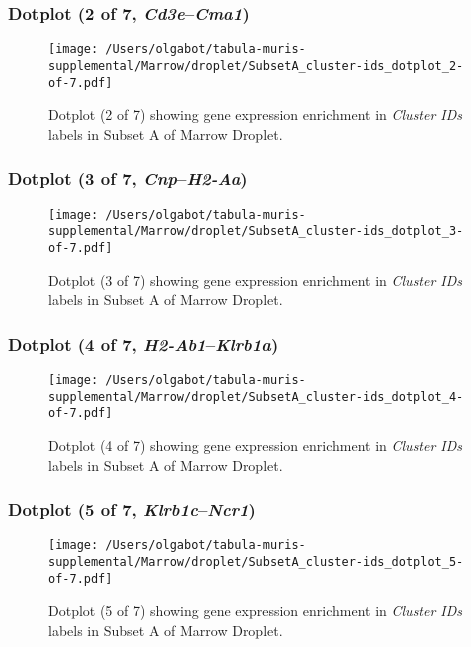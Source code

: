 \clearpage

\subsubsection{Dotplot (2 of 7, \emph{Cd3e}--\emph{Cma1})}
\begin{figure}[h]
\centering
\texttt{[image: /Users/olgabot/tabula-muris-supplemental/Marrow/droplet/SubsetA\_cluster-ids\_dotplot\_2-of-7.pdf]}

\caption{ Dotplot (2 of 7)  showing gene expression enrichment in \emph{Cluster IDs} labels in Subset A of Marrow Droplet. }
\end{figure}


\clearpage

\subsubsection{Dotplot (3 of 7, \emph{Cnp}--\emph{H2-Aa})}
\begin{figure}[h]
\centering
\texttt{[image: /Users/olgabot/tabula-muris-supplemental/Marrow/droplet/SubsetA\_cluster-ids\_dotplot\_3-of-7.pdf]}

\caption{ Dotplot (3 of 7)  showing gene expression enrichment in \emph{Cluster IDs} labels in Subset A of Marrow Droplet. }
\end{figure}


\clearpage

\subsubsection{Dotplot (4 of 7, \emph{H2-Ab1}--\emph{Klrb1a})}
\begin{figure}[h]
\centering
\texttt{[image: /Users/olgabot/tabula-muris-supplemental/Marrow/droplet/SubsetA\_cluster-ids\_dotplot\_4-of-7.pdf]}

\caption{ Dotplot (4 of 7)  showing gene expression enrichment in \emph{Cluster IDs} labels in Subset A of Marrow Droplet. }
\end{figure}


\clearpage

\subsubsection{Dotplot (5 of 7, \emph{Klrb1c}--\emph{Ncr1})}
\begin{figure}[h]
\centering
\texttt{[image: /Users/olgabot/tabula-muris-supplemental/Marrow/droplet/SubsetA\_cluster-ids\_dotplot\_5-of-7.pdf]}

\caption{ Dotplot (5 of 7)  showing gene expression enrichment in \emph{Cluster IDs} labels in Subset A of Marrow Droplet. }
\end{figure}


